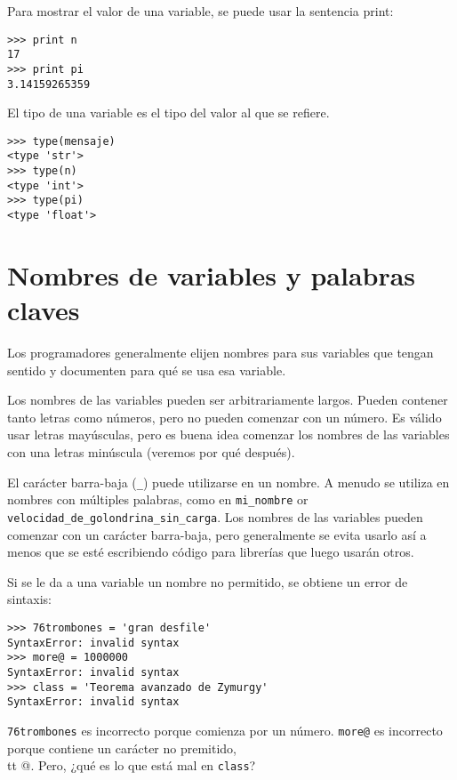 Para mostrar el valor de una variable, se puede usar la sentencia print:

\beforeverb
\begin{verbatim}
>>> print n
17
>>> print pi
3.14159265359
\end{verbatim}
\afterverb
%
El tipo de una variable es el tipo del valor al que se refiere.

\beforeverb
\begin{verbatim}
>>> type(mensaje)
<type 'str'>
>>> type(n)
<type 'int'>
>>> type(pi)
<type 'float'>
\end{verbatim}
\afterverb
%

\section{Nombres de variables y palabras claves}

Los programadores generalmente elijen nombres para sus variables que
tengan sentido y documenten para qué se usa esa variable.

Los nombres de las variables pueden ser arbitrariamente largos. Pueden contener
tanto letras como números, pero no pueden comenzar con un número.
Es válido usar letras mayúsculas, pero es buena idea
comenzar los nombres de las variables con una letras minúscula (veremos
por qué después).

El carácter barra-baja (\verb"_") puede utilizarse en un nombre.
A menudo se utiliza en nombres con múltiples palabras, como en
\verb"mi_nombre" or \verb"velocidad_de_golondrina_sin_carga".
Los nombres de las variables pueden comenzar con un carácter barra-baja, pero
generalmente se evita usarlo así a menos que se esté escribiendo código
para librerías que luego usarán otros.


Si se le da a una variable un nombre no permitido, se obtiene un error de sintaxis:

\beforeverb
\begin{verbatim}
>>> 76trombones = 'gran desfile'
SyntaxError: invalid syntax
>>> more@ = 1000000
SyntaxError: invalid syntax
>>> class = 'Teorema avanzado de Zymurgy'
SyntaxError: invalid syntax
\end{verbatim}
\afterverb
%
{\tt 76trombones} es incorrecto porque comienza por un número.
{\tt more@} es incorrecto porque contiene un carácter no premitido, {\\tt @}.
Pero, ¿qué es lo que está mal en {\tt class}?


